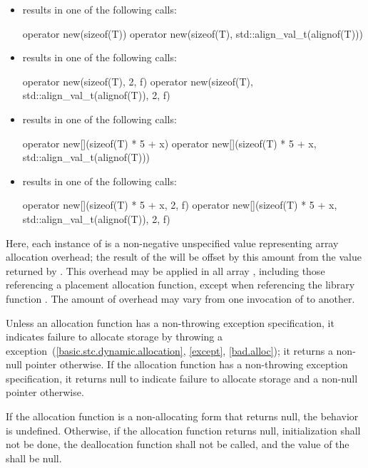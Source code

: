 \pnum
\begin{example}
\begin{itemize}
\item {} results in one of the following calls:
\begin{codeblock}
operator new(sizeof(T))
operator new(sizeof(T), std::align_val_t(alignof(T)))
\end{codeblock}
\item {} results in one of the following calls:
\begin{codeblock}
operator new(sizeof(T), 2, f)
operator new(sizeof(T), std::align_val_t(alignof(T)), 2, f)
\end{codeblock}
\item {} results in one of the following calls:
\begin{codeblock}
operator new[](sizeof(T) * 5 + x)
operator new[](sizeof(T) * 5 + x, std::align_val_t(alignof(T)))
\end{codeblock}
\item {} results in one of the following calls:
\begin{codeblock}
operator new[](sizeof(T) * 5 + x, 2, f)
operator new[](sizeof(T) * 5 + x, std::align_val_t(alignof(T)), 2, f)
\end{codeblock}
\end{itemize}
Here, each instance of  is a non-negative unspecified value
representing array allocation overhead; the result of the
 will be offset by this amount from the value
returned by . This overhead may be applied in all
array , including those referencing
a placement allocation function, except when referencing
the library function .
The amount of overhead may vary from one
invocation of  to another.
\end{example}

\pnum
\begin{note}
Unless an allocation function has a non-throwing
exception specification,
it indicates failure to allocate storage by throwing a
%
%
 exception~(\ref{basic.stc.dynamic.allocation},
\ref{except}, \ref{bad.alloc});
it returns a non-null pointer otherwise. If the allocation function
has a non-throwing exception specification,
it returns null to indicate failure to allocate storage
and a non-null pointer otherwise.
\end{note}
If the allocation function is a non-allocating
form that returns null,
the behavior is undefined.
Otherwise,
if the allocation function returns null, initialization shall not be
done, the deallocation function shall not be called, and the value of
the  shall be null.

